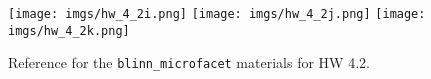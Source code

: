 \begin{figure}[ht]
    \centering
    \texttt{[image: imgs/hw\_4\_2i.png]}
    \texttt{[image: imgs/hw\_4\_2j.png]}
    \texttt{[image: imgs/hw\_4\_2k.png]}
    \caption{Reference for the \lstinline{blinn_microfacet} materials for HW 4.2.}
    \label{fig:hw_4_2_blinn_microfacet}
\end{figure}

%
%


